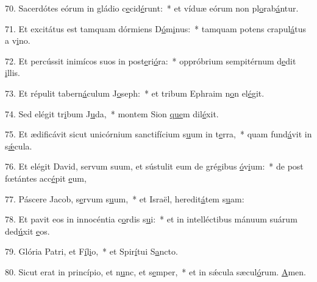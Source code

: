 70. Sacerdótes eórum in gládio c\uline{e}cid\uline{é}runt:~* et víduæ eórum non pl\uline{o}rab\uline{á}ntur.\par 
71. Et excitátus est tamquam dórmiens D\uline{ó}m\uline{i}nus:~* tamquam potens crapul\uline{á}tus a v\uline{i}no.\par 
72. Et percússit inimícos suos in post\uline{e}ri\uline{ó}ra:~* oppróbrium sempitérnum d\uline{e}dit \uline{i}llis.\par 
73. Et répulit tabern\uline{á}culum J\uline{o}seph:~* et tribum Ephraim n\uline{o}n el\uline{é}git.\par 
74. Sed elégit tr\uline{i}bum J\uline{u}da,~* montem Sion \uline{que}m dil\uline{é}xit.\par 
75. Et ædificávit sicut unicórnium sanctifícium s\uline{u}um in t\uline{e}rra,~* quam fund\uline{á}vit in s\uline{ǽ}cula.\par 
76. Et elégit David, servum suum, et sústulit eum de grégibus \uline{ó}v\uline{i}um:~* de post fœtántes acc\uline{é}pit \uline{e}um,\par 
77. Páscere Jacob, s\uline{e}rvum s\uline{u}um,~* et Israël, heredit\uline{á}tem s\uline{u}am:\par 
78. Et pavit eos in innocéntia c\uline{o}rdis s\uline{u}i:~* et in intelléctibus mánuum suárum ded\uline{ú}xit \uline{e}os.\par 
79. Glória Patri, et F\uline{í}l\uline{i}o,~* et Spir\uline{í}tui S\uline{a}ncto.\par 
80. Sicut erat in princípio, et n\uline{u}nc, et s\uline{e}mper,~* et in sǽcula sæcul\uline{ó}rum. \uline{A}men.\par 
